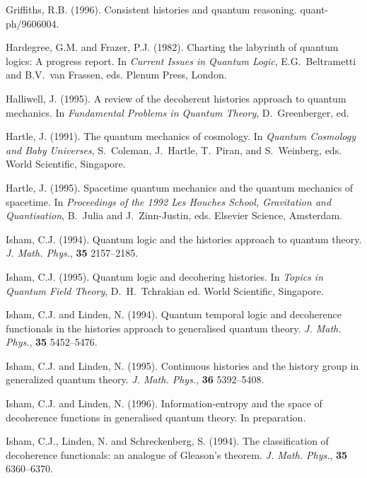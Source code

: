 \documentclass[12pt]{article}
\begin{document}
\begin{trivlist}
\item[] Griffiths, R.B. (1996).
  Consistent histories and quantum reasoning. quant-ph/9606004.

\item[] Hardegree, G.M. and Frazer, P.J. (1982).
  Charting the labyrinth of quantum logics: {A} progress report.
  In {\em Current Issues in Quantum Logic}, E.G.~Beltrametti
  and B.V.~van Frassen, eds. Plenum Press, London.

\item[] Halliwell, J. (1995).
	A review of the decoherent histories approach to quantum
	mechanics. In {\em Fundamental Problems in Quantum Theory},
	D.~Greenberger, ed. 

\item[] Hartle, J. (1991). The quantum mechanics of cosmology.
  In {\em Quantum Cosmology and Baby Universes}, S.~Coleman, J.~Hartle,
  T.~Piran, and S.~Weinberg, eds. World Scientific, Singapore.

\item[] Hartle, J. (1995).
  Spacetime quantum mechanics and the quantum mechanics of spacetime.
  In  {\em Proceedings of the 1992 Les Houches School,
  Gravitation and Quantisation}, B.~Julia and J.~Zinn-Justin, eds.
  Elsevier Science, Amsterdam.

\item[] Isham, C.J. (1994).
  Quantum logic and the histories approach to quantum theory.
  {\em J. Math. Phys.}, {\bf 35} 2157--2185.

\item[] Isham, C.J. (1995). 
  Quantum logic and decohering histories. 
  In {\em Topics in Quantum Field Theory}, D.~H.~Tchrakian ed. 
  World Scientific, Singapore.

\item[] Isham, C.J. and Linden, N. (1994).
  Quantum temporal logic and decoherence functionals in the histories
  approach to generalised quantum theory.
  {\em J. Math. Phys.}, {\bf 35} 5452--5476.

\item[] Isham, C.J. and Linden, N. (1995).
  Continuous histories and the history group in generalized quantum
  theory. {\em J. Math. Phys.}, {\bf 36} 5392--5408.

\item[] Isham, C.J. and Linden, N. (1996).
	Information-entropy and the space of decoherence functions in
	generalised quantum theory.
	In preparation. 

\item[] Isham, C.J., Linden, N. and Schreckenberg, S. (1994).
  The classification of decoherence functionals: an analogue of
  {G}leason's theorem. {\em J. Math. Phys.}, {\bf 35} 6360--6370.


\end{trivlist}
\end{document}
